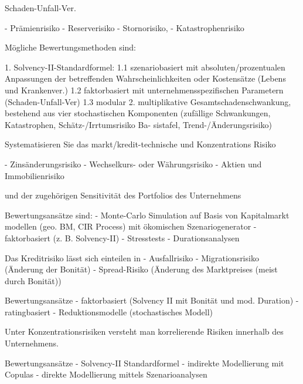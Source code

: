 Schaden-Unfall-Ver.

- Prämienrisiko
- Reserverisiko
- Stornorisiko,
- Katastrophenrisiko

Mögliche Bewertungsmethoden sind:

1. Solvency-II-Standardformel:
1.1 szenariobasiert mit absoluten/prozentualen Anpassungen der betreffenden Wahrscheinlichkeiten oder Kostensätze (Lebens und Krankenver.)
1.2 faktorbasiert mit unternehmensspezifischen Parametern (Schaden-Unfall-Ver)
1.3 modular 
2. multiplikative Gesamtschadenschwankung, bestehend aus vier stochastischen
Komponenten (zufällige Schwankungen, Katastrophen, Schätz-/Irrtumsrisiko Ba-
sistafel, Trend-/Änderungsrisiko)



Systematisieren Sie das markt/kredit-technische und Konzentrations Risiko

- Zinsänderungsrisiko
- Wechselkurs- oder Währungsrisiko
- Aktien und Immobilienrisiko

und der zugehörigen Sensitivität des Portfolios des Unternehmens

Bewertungsansätze sind:
- Monte-Carlo Simulation auf Basis von Kapitalmarkt modellen (geo. BM, CIR Process) mit ökomischen Szenariogenerator 
- faktorbasiert (z. B. Solvency-II)
- Stresstests
- Durationsanalysen

Das Kreditrisiko lässt sich einteilen in
- Ausfallrisiko
- Migrationsrisiko (Änderung der Bonität)
- Spread-Risiko (Änderung des Marktpreises (meist durch Bonität))

Bewertungsansätze
- faktorbasiert (Solvency II mit Bonität und mod. Duration)
- ratingbasiert
- Reduktionsmodelle (stochastisches Modell)

Unter Konzentrationsrisiken versteht man korrelierende Risiken 
innerhalb des Unternehmens.

Bewertungsansätze
- Solvency-II Standardformel
- indirekte Modellierung mit Copulas
- direkte Modellierung mittels Szenarioanalysen


